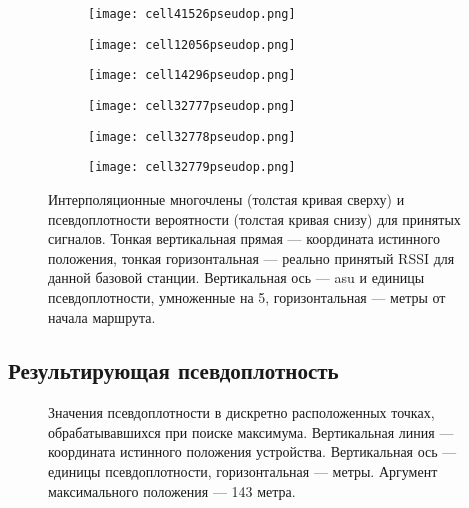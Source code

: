 \begin{figure}[p]
	\begin{center}
		\begin{subfigure}[b]{1\textwidth}
			\texttt{[image: cell41526pseudop.png]}
		\end{subfigure}

		\begin{subfigure}[b]{0.4\textwidth}
			\texttt{[image: cell12056pseudop.png]}
		\end{subfigure}
		\begin{subfigure}[b]{0.4\textwidth}
			\texttt{[image: cell14296pseudop.png]}
		\end{subfigure}

		\begin{subfigure}[b]{0.25\textwidth}
			\texttt{[image: cell32777pseudop.png]}
		\end{subfigure}
		\begin{subfigure}[b]{0.25\textwidth}
			\texttt{[image: cell32778pseudop.png]}
		\end{subfigure}
		\begin{subfigure}[b]{0.25\textwidth}
			\texttt{[image: cell32779pseudop.png]}
		\end{subfigure}
	\end{center}
	\caption{Интерполяционные многочлены (толстая кривая сверху) и псевдоплотности вероятности (толстая кривая снизу) для принятых сигналов. Тонкая вертикальная прямая --- координата истинного положения, тонкая горизонтальная --- реально принятый RSSI для данной базовой станции. Вертикальная ось --- asu и единицы псевдоплотности, умноженные на 5, горизонтальная --- метры от начала маршрута.}
	\label{fig:exp-cell-pseudop}
\end{figure}

\subsection{Результирующая псевдоплотность}
\begin{figure}[h]
	\caption{Значения псевдоплотности в дискретно расположенных точках, обрабатывавшихся при поиске максимума. Вертикальная линия --- координата истинного положения устройства. Вертикальная ось --- единицы псевдоплотности, горизонтальная --- метры. Аргумент максимального положения --- 143 метра.}
	\label{fig:totalpseudop}
\end{figure}

